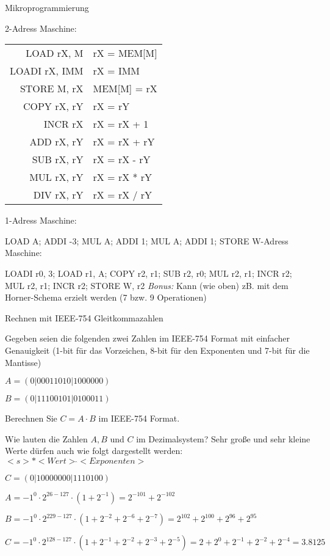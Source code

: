 \documentclass{exercisesheet}
\begin{document}
\begin{exercise}{Mikroprogrammierung}
\begin{multicols}{2}
    2-Adress Maschine:\par
    \begin{tabular}{|r|l|}
      \hline
      LOAD rX, M    & rX = MEM[M]  \\
      LOADI rX, IMM & rX = IMM     \\
      STORE M, rX   & MEM[M] = rX  \\
      COPY rX, rY   & rX = rY      \\
      INCR rX       & rX = rX + 1  \\
      ADD rX, rY    & rX = rX + rY \\
      SUB rX, rY    & rX = rX - rY \\
      MUL rX, rY    & rX = rX * rY \\
      DIV rX, rY    & rX = rX / rY \\
      \hline
    \end{tabular}
  \end{multicols}

  \begin{solution}
    1-Adress Maschine:\par LOAD A; ADDI -3; MUL A; ADDI 1; MUL A; ADDI 1; STORE W-Adress Maschine:\par LOADI r0, 3; LOAD r1, A; COPY r2, r1; SUB r2, r0; MUL r2, r1; INCR r2; MUL r2, r1; INCR r2; STORE W, r2\newline
    \textit{Bonus:} Kann (wie oben) zB. mit dem Horner-Schema erzielt werden (7 bzw. 9 Operationen)
  \end{solution}
\end{exercise}

\begin{eexercises}[4]{Rechnen mit IEEE-754 Gleitkommazahlen}{
    Gegeben seien die folgenden zwei Zahlen im IEEE-754 Format mit einfacher Genauigkeit (1-bit für das Vorzeichen, 8-bit für den Exponenten und 7-bit für die Mantisse)\par
    \centering $A = (0|00011010|1000000)$\par $B = (0|11100101|0100011)$
  }
  \item Berechnen Sie $C = A \cdot B$ im IEEE-754 Format.
  \item Wie lauten die Zahlen $A, B$ und $C$ im Dezimalsystem? Sehr große und sehr kleine Werte dürfen auch wie folgt dargestellt werden: $<s>*<Wert> \hat{} <Exponenten>$
\end{eexercises}

\begin{solutions}
  \item $C = (0|10000000|1110100)$
  \item
  $A = {-1}^0 \cdot 2^{26-127} \cdot (1+2^{-1}) = 2^{-101} + 2^{-102}$\par
  $B = {-1}^0 \cdot 2^{229-127} \cdot (1+2^{-2}+2^{-6}+2^{-7}) = 2^{102} + 2^{100} + 2^{96} + 2^{95}$\par
  $C = {-1}^0 \cdot 2^{128-127} \cdot (1+2^{-1}+2^{-2}+2^{-3}+2^{-5}) = 2 + 2^0 + 2^{-1} + 2^{-2} + 2^{-4} = 3.8125$
\end{solutions}
\end{document}
